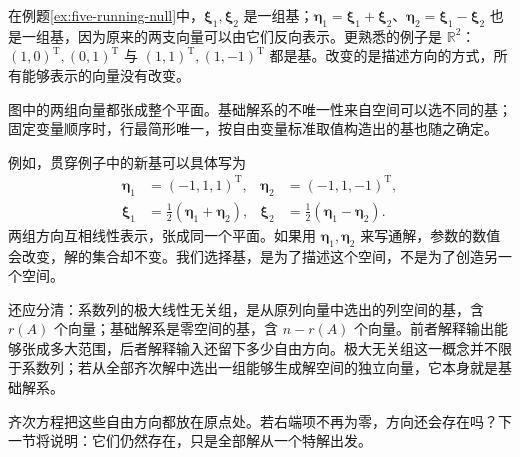 \documentclass[a4paper,12pt,twoside,openany,fontset=none]{ctexbook}
\numberwithin{equation}{chapter}
\begin{document}
在例题\ref{ex:five-running-null}中，$\boldsymbol\xi_1,\boldsymbol\xi_2$ 是一组基；$\boldsymbol\eta_1=\boldsymbol\xi_1+\boldsymbol\xi_2$、$\boldsymbol\eta_2=\boldsymbol\xi_1-\boldsymbol\xi_2$ 也是一组基，因为原来的两支向量可以由它们反向表示。更熟悉的例子是 $\mathbb R^2$：$(1,0)^{\mathrm T},(0,1)^{\mathrm T}$ 与 $(1,1)^{\mathrm T},(1,-1)^{\mathrm T}$ 都是基。改变的是描述方向的方式，所有能够表示的向量没有改变。

{图中的两组向量都张成整个平面。基础解系的不唯一性来自空间可以选不同的基；固定变量顺序时，行最简形唯一，按自由变量标准取值构造出的基也随之确定。}

例如，贯穿例子中的新基可以具体写为
\begin{align}
 \boldsymbol\eta_1&=(-1,1,1)^{\mathrm T},&
 \boldsymbol\eta_2&=(-1,1,-1)^{\mathrm T},\\
 \boldsymbol\xi_1&=\tfrac12(\boldsymbol\eta_1+\boldsymbol\eta_2),&
 \boldsymbol\xi_2&=\tfrac12(\boldsymbol\eta_1-\boldsymbol\eta_2).
\end{align}
两组方向互相线性表示，张成同一个平面。如果用 $\boldsymbol\eta_1,\boldsymbol\eta_2$ 来写通解，参数的数值会改变，解的集合却不变。我们选择基，是为了描述这个空间，不是为了创造另一个空间。

还应分清：系数列的极大线性无关组，是从原列向量中选出的列空间的基，含 $r(A)$ 个向量；基础解系是零空间的基，含 $n-r(A)$ 个向量。前者解释输出能够张成多大范围，后者解释输入还留下多少自由方向。极大无关组这一概念并不限于系数列；若从全部齐次解中选出一组能够生成解空间的独立向量，它本身就是基础解系。

齐次方程把这些自由方向都放在原点处。若右端项不再为零，方向还会存在吗？下一节将说明：它们仍然存在，只是全部解从一个特解出发。
\end{document}

